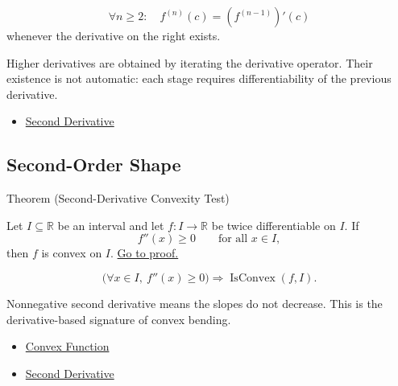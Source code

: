 \begin{remark*}
\[
  \forall n\geq 2:\quad
  f^{(n)}(c)=(f^{(n-1)})'(c)
\]
whenever the derivative on the right exists.
\end{remark*}

\begin{remark*}[Interpretation]
Higher derivatives are obtained by iterating the derivative operator. Their existence is not automatic: each stage requires differentiability of the previous derivative.
\end{remark*}

\begin{dependencies}
\begin{itemize}
  \item \hyperref[def:second-derivative]{Second Derivative}
\end{itemize}
\end{dependencies}

\subsection{Second-Order Shape}

\begin{theorembox}{Theorem (Second-Derivative Convexity Test)}
\begin{theorem}
\label{thm:second-derivative-convexity-test}
Let $I\subseteq\mathbb{R}$ be an interval and let $f:I\to\mathbb{R}$ be twice differentiable on $I$. If
\[
  f''(x)\geq 0 \qquad \text{for all } x\in I,
\]
then $f$ is convex on $I$.
\hyperref[prf:second-derivative-convexity-test]{Go to proof.}
\end{theorem}
\end{theorembox}

\begin{remark*}
\[
  \bigl(\forall x\in I,\ f''(x)\geq 0\bigr)
  \Longrightarrow
  \operatorname{IsConvex}(f,I).
\]
\end{remark*}

\begin{remark*}[Interpretation]
Nonnegative second derivative means the slopes do not decrease. This is the derivative-based signature of convex bending.
\end{remark*}

\begin{dependencies}
\begin{itemize}
  \item \hyperref[def:convex-function]{Convex Function}
  \item \hyperref[def:second-derivative]{Second Derivative}
\end{itemize}
\end{dependencies}

